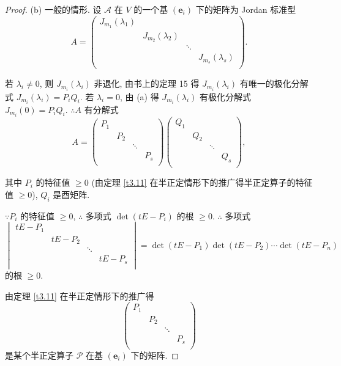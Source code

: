 \documentclass{ctexart}
\begin{document}
\begin{proof}
    (b) 一般的情形. 设 $\mathcal{A}$ 在 $V$ 的一个基 $(\boldsymbol{e}_i)$ 下的矩阵为 Jordan 标准型
    \[A=\begin{pmatrix}
        J_{m_1}(\lambda_1) \\
        & J_{m_2}(\lambda_2) \\
        && \ddots \\
        &&& J_{m_s}(\lambda_s) \\
    \end{pmatrix}.\]

    若 $\lambda_i\neq0$, 则 $J_{m_i}(\lambda_i)$ 非退化, 由书上的定理 15 得 $J_{m_i}(\lambda_i)$ 有唯一的极化分解式 $J_{m_i}(\lambda_i)=P_iQ_i$. 若 $\lambda_i=0$, 由 (a) 得 $J_{m_i}(\lambda_i)$ 有极化分解式 $J_{m_i}(0)=P_iQ_i$. $\therefore A$ 有分解式
    \begin{equation}\label{eq3.6}
        A=\begin{pmatrix}
            P_1 \\
            & P_2 \\
            && \ddots \\
            &&& P_s \\
        \end{pmatrix}\begin{pmatrix}
            Q_1 \\
            & Q_2 \\
            && \ddots \\
            &&& Q_s \\
        \end{pmatrix},
    \end{equation}

    其中 $P_i$ 的特征值 $\geq0$ (由定理 \ref{t3.11} 在半正定情形下的推广得半正定算子的特征值 $\geq0$), $Q_i$ 是酉矩阵.

    $\because P_i$ 的特征值 $\geq0$, $\therefore$ 多项式 $\det(tE-P_i)$ 的根 $\geq0$. $\therefore$ 多项式
    \[\begin{vmatrix}
        tE-P_1 \\
        & tE-P_2 \\
        && \ddots \\
        &&& tE-P_s \\
    \end{vmatrix}=\det(tE-P_1)\det(tE-P_2)\cdots\det(tE-P_n)\]
    的根 $\geq0$.

    由定理 \ref{t3.11} 在半正定情形下的推广得
    \[\begin{pmatrix}
        P_1 \\
        & P_2 \\
        && \ddots \\
        &&& P_s \\
    \end{pmatrix}\]
    是某个半正定算子 $\mathcal{P}$ 在基 $(\boldsymbol{e}_i)$ 下的矩阵.


\end{proof}
\end{document}
